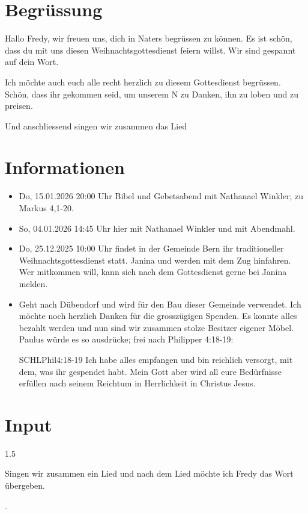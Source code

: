 \documentclass{mybib}
\newcommand{\Name}{Fredy}
\begin{document}
\section{Begrüssung}
Hallo \Name{}, wir freuen uns, dich in Naters begrüssen zu können. Es ist schön, dass du mit uns diesen Weihnachtsgottesdienst feiern willst. Wir sind gespannt auf dein Wort.

Ich möchte auch euch alle recht herzlich zu diesem Gottesdienst begrüssen. Schön, dass ihr gekommen seid, um unserem \herr N zu Danken, ihn zu loben und zu preisen.

\beten{} Und anschliessend singen wir zusammen das Lied



\section{Informationen}
\begin{itemize}
    \item {} Do, 15.01.2026 20:00 Uhr Bibel und Gebetsabend mit Nathanael Winkler; zu Markus 4,1-20.
    \item {} So, 04.01.2026 14:45 Uhr hier mit Nathanael Winkler und mit Abendmahl. 
    \item {} Do, 25.12.2025 10:00 Uhr findet in der Gemeinde Bern ihr traditioneller Weihnachtsgottesdienst statt. Janina und werden mit dem Zug hinfahren. Wer mitkommen will, kann sich nach dem Gottesdienst gerne bei Janina melden.
    \item {} Geht nach Dübendorf und wird für den Bau dieser Gemeinde verwendet. Ich möchte noch herzlich Danken für die grosszügigen Spenden. Es konnte alles bezahlt werden und nun sind wir zusammen stolze Besitzer eigener Möbel.\\
    Paulus würde es so ausdrücke; frei nach Philipper 4:18-19:
    \begin{bibelbox}{SCHL}{Phil}{4:18-19}
        Ich habe alles empfangen und bin reichlich versorgt, mit dem, was ihr gespendet habt. Mein Gott aber wird all eure Bedürfnisse erfüllen nach seinem Reichtum in Herrlichkeit in Christus Jesus.        
    \end{bibelbox}
\end{itemize}

\section{ Input }
\begin{spacing}{1.5}
    
    Singen wir zusammen ein Lied und nach dem Lied möchte ich \Name{} das Wort übergeben.

    .
   
\end{spacing}
\end{document}
